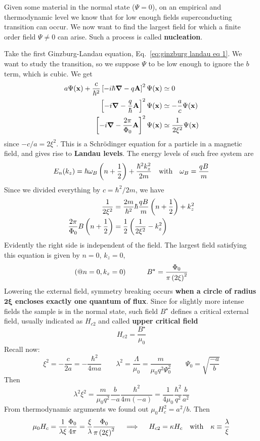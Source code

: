 Given some material in the normal state ($\Psi=0$), on an empirical and thermodynamic level we know that for low enough fields superconducting transition can occur. We now want to find the largest field for which a finite order field $\Psi\neq0$ can arise. Such a process is called \textbf{nucleation}.

Take the first Ginzburg-Landau equation, Eq.~\eqref{eq:ginzburg landau eq 1}. We want to study the transition, so we suppose $\Psi$ to be low enough to ignore the $b$ term, which is cubic. We get
\[
\begin{aligned}
    a \Psi(\mathbf{x}) + \frac{c}{\hbar^2} \left[{-i\hbar\grad - q \mathbf{A}}\right]^2 \Psi(\mathbf{x}) &\simeq 0 \\
    \left[{-i\grad - \frac{q}{\hbar} \mathbf{A}}\right]^2 \Psi(\mathbf{x}) &\simeq -\frac{a}{c} \Psi(\mathbf{x}) \\
    \left[{-i\grad - \frac{2\pi}{\Phi_0} \mathbf{A}}\right]^2 \Psi(\mathbf{x}) &\simeq \frac{1}{2\xi^2} \Psi(\mathbf{x})
\end{aligned}
\]
since $-c/a = 2\xi^2$. This is a Schrödinger equation for a particle in a magnetic field, and gives rise to \textbf{Landau levels}. The energy levels of such free system are
\[
    E_n(k_z) = \hbar\omega_B \lrR{n+\half} + \frac{\hbar^2k_z^2}{2m}
    \qq{with}
    \omega_B = \frac{qB}{m}
\]
Since we divided everything by $c=\hbar^2/2m$, we have
\[
\begin{aligned}
    \frac{1}{2\xi^2} &= \frac{2m}{\hbar^2} \hbar\frac{qB}{m}\lrR{n+\half} + k_z^2\\
    \frac{2\pi}{\Phi_0}B\lrR{n+\half} &= \half\lrR{\frac{1}{2\xi^2}-k_z^2}
\end{aligned}
\]
Evidently the right side is independent of the field. The largest field satisfying this equation is given by $n=0$, $k_z=0$,
\[
    (@n=0,k_z=0)
    \qquad\quad
    B^\star = \frac{\Phi_0}{\pi\left({2\xi}\right)^2}
\]
Lowering the external field, symmetry breaking occurs \textbf{when a circle of radius $\bm{2\xi}$ encloses exactly one quantum of flux}. Since for slightly more intense fields the sample is in the normal state, such field $B^\star$ defines a critical external field, usually indicated as $H_{c2}$ and called \textbf{upper critical field}
\[
    H_{c2} = \frac{B^\star}{\mu_0}
\]
Recall now:
\[
    \xi^2 = -\frac{c}{2a} = - \frac{\hbar^2}{4ma}
    \qquad
    \lambda^2 = \frac{\Lambda}{\mu_0} = \frac{m}{\mu_0 q^2 \Psi_0^2}
    \qquad
    \Psi_0 = \sqrt{\frac{-a}{b}}
\]
Then
\[
    \lambda^2 \xi^2 = \frac{m}{\mu_0 q^2} \frac{b}{-a} \frac{\hbar^2}{4m (-a)} = \frac{1}{4 \mu_0} \frac{\hbar^2}{q^2} \frac{b}{a^2}
\]
From thermodynamic arguments we found out $\mu_0 H_c^2 = a^2/b$. Then
\[
    \mu_0 H_c = \frac{1}{\lambda\xi} \frac{\Phi_0}{4\pi} = \frac{\xi}{\lambda} \frac{\Phi_0}{\pi\lrR{2\xi}^2}
    \quad\implies\quad
    H_{c2} = \kappa H_c
    \qq{with} \kappa \equiv \frac{\lambda}{\xi}
\]

